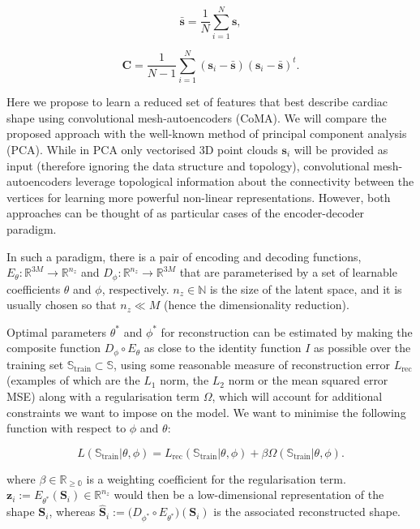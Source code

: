 \begin{equation}
\bar{\textbf{s}}=\frac{1}{N}\sum_{i=1}^{N}{\textbf{s}},
\end{equation}

\begin{equation}
\textbf{C}=\frac{1}{N-1}\sum_{i=1}^{N}({\textbf{s}}_i-\bar{\textbf{s}})({\textbf{s}}_i-\bar{\textbf{s}})^t.
\end{equation}

Here we propose to learn a reduced set of features that best describe cardiac shape using convolutional mesh-autoencoders (CoMA). We will compare the proposed approach with the well-known method of principal component analysis (PCA). While in PCA only vectorised 3D point clouds $\textbf{s}_i$ will be provided as input (therefore ignoring the data structure and topology), convolutional mesh-autoencoders leverage topological information about the connectivity between the vertices for learning more powerful non-linear representations. However, both approaches can be thought of as particular cases of the encoder-decoder paradigm.

In such a paradigm, there is a pair of encoding and decoding functions, $E_{\theta}:\mathbb{R}^{3M}\rightarrow\mathbb{R}^{n_z}$ and $D_{\phi}:\mathbb{R}^{n_z}\rightarrow\mathbb{R}^{3M}$ that are parameterised by a set of learnable coefficients $\theta$ and $\phi$, respectively. $n_z\in\mathbb{N}$ is the size of the latent space, and it is usually chosen so that $n_z\ll M$ (hence the dimensionality reduction). 

Optimal parameters $\theta^*$ and $\phi^*$ for reconstruction can be estimated by making the composite function $D_{\phi} \circ E_{\theta}$ as close to the identity function $I$ as possible over the training set $\mathbb{S}_\text{train}\subset\mathbb{S}$, using some reasonable measure of reconstruction error $L_{\text{rec}}$ (examples of which are the $L_1$ norm, the $L_2$ norm or the mean squared error MSE) along with a regularisation term $\Omega$, which will account for additional constraints we want to impose on the model. We want to minimise the following function with respect to $\phi$ and $\theta$: 

\begin{equation}
L(\mathbb{S}_\text{train}|\theta, \phi)=
L_{\text{rec}}(\mathbb{S}_\text{train}|\theta, \phi)+
\beta\Omega(\mathbb{S}_\text{train}|\theta, \phi).
\label{eq_loss_function}
\end{equation}

\noindent where $\beta\in\mathbb{R_{\geq 0}}$ is a weighting coefficient for the regularisation term. $\textbf{z}_i:= E_{\theta^*}  (\textbf{S}_i)\in\mathbb{R}^{n_z}$ would then be a low-dimensional representation of the shape $\textbf{S}_i$, whereas $\hat{\textbf{S}}_i:=\big(D_{\phi^*} \circ E_{\theta^*}\big)(\textbf{S}_i)$ is the associated reconstructed shape.


